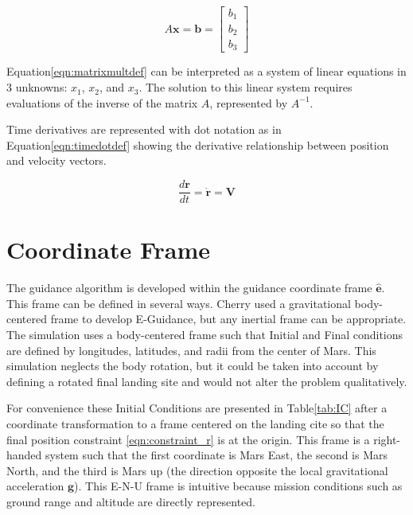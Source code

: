 \begin{equation}
\label{eqn:matrixmultdef}
A\bm{x} = \bm{b} =
\begin{bmatrix}
b_1 \\
b_2 \\
b_3
\end{bmatrix}
\end{equation}

Equation\:\ref{eqn:matrixmultdef} can be interpreted as a system of linear equations in 3 unknowns: $x_1$, $x_2$, and $x_3$. The solution to this linear system requires evaluations of the inverse of the matrix $A$, represented by $A^{-1}$. 

Time derivatives are represented with dot notation as in Equation\:\ref{eqn:timedotdef} showing the derivative relationship between position and velocity vectors.

\begin{equation}
\label{eqn:timedotdef}
\frac{d\bm{r}}{dt} = \dot{\bm{r}} = \bm{V}
\end{equation}


\section{Coordinate Frame}
The guidance algorithm is developed within the guidance coordinate frame $\bm{\hat{e}}$. This frame can be defined in several ways. Cherry\:\cite{CHERRY} used a gravitational body-centered frame to develop E-Guidance, but any inertial frame can be appropriate. The simulation uses a body-centered frame such that Initial and Final conditions are defined by longitudes, latitudes, and radii from the center of Mars. This simulation neglects the body rotation, but it could be taken into account by defining a rotated final landing site and would not alter the problem qualitatively. 

For convenience these Initial Conditions are presented in Table\:\ref{tab:IC} after a coordinate transformation to a frame centered on the landing cite so that the final position constraint \ref{eqn:constraint_r} is at the origin. This frame is a right-handed system such that the first coordinate is Mars East, the second is Mars North, and the third is Mars up (the direction opposite the local gravitational acceleration $\bm{g}$). This E-N-U frame is intuitive because mission conditions such as ground range and altitude are directly represented.  


